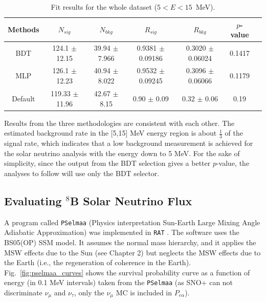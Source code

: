 {\begin{table}[ht]
	\small{
	\centering
	\caption{Fit results for the whole dataset ($5<E<15$~MeV).	\label{table:wholedata_output}}
	\begin{tabular*}{150mm}{c@{\extracolsep{\fill}}cccccc}
		\toprule
		Methods & $N_{sig}$ & $N_{bkg}$ & $R_{sig}$ & $R_{bkg}$ & $p$-value\\
		\hline
		BDT & 124.1 $\pm$ 12.15 & 39.94 $\pm$ 7.966 & 0.9381 $\pm$ 0.09186 & 0.3020 $\pm$ 0.06024 & 0.1417\\
		MLP & 126.1 $\pm$ 12.23 & 40.94 $\pm$ 8.022 & 0.9532 $\pm$ 0.09245  & 0.3096 $\pm$ 0.06066  & 0.1179\\
		Default & 119.33 $\pm$ 11.96 & 42.67 $\pm$ 8.15 &  0.90 $\pm$ 0.09 & 0.32 $\pm$ 0.06 & 0.19\\
		\bottomrule
	\end{tabular*}
}
\end{table}

Results from the three methodologies are consistent with each other. The estimated background rate in the [5,15] MeV energy region is about $\frac{1}{3}$ of the signal rate, which indicates that a low background measurement is achieved for the solar neutrino analysis with the energy down to 5 MeV. For the sake of simplicity, since the output from the BDT selection gives a better $p$-value, the analyses to follow will use only the BDT selector. 

\subsection{Evaluating $^8$B Solar Neutrino Flux}\label{sect:evaluateFlux}

A program called \texttt{PSelmaa} (Physics interpretation Sun-Earth Large Mixing Angle Adiabatic
Approximation) was implemented in \texttt{RAT} \cite{fady_pselmaa}. The software uses the BS05(OP) SSM model. It assumes the normal mass hierarchy, and it applies the MSW effects due to the Sun (see Chapter 2) but neglects the MSW effects due to the Earth (i.e., the regeneration of coherence in the Earth). Fig.~\ref{fig:pselmaa_curves} shows the survival probability curve as a function of energy (in 0.1 MeV intervals) taken from the \texttt{PSelmaa} (as SNO+ can not discriminate $\nu_\mu$ and $\nu_\tau$, only the $\nu_\mu$ MC is included in $P_{e\alpha}$).

}
